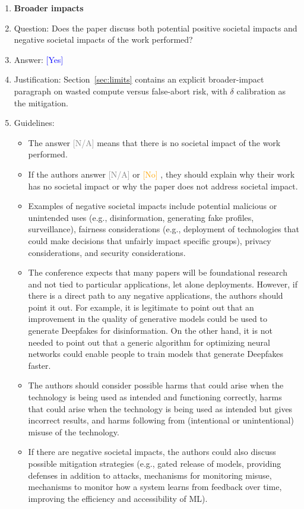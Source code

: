 \documentclass{article}
\providecommand{\answerYes}[1][]{\textcolor{blue}{[Yes] #1}}
\providecommand{\answerNo}[1][]{\textcolor{orange}{[No] #1}}
\providecommand{\answerNA}[1][]{\textcolor{gray}{[N/A] #1}}
\begin{document}
\begin{enumerate}
\item {\bf Broader impacts}
    \item[] Question: Does the paper discuss both potential positive societal impacts and negative societal impacts of the work performed?
    \item[] Answer: \answerYes{}
    \item[] Justification: Section~\ref{sec:limits} contains an explicit broader-impact paragraph on wasted compute versus false-abort risk, with $\delta$ calibration as the mitigation.
    \item[] Guidelines:
    \begin{itemize}
        \item The answer \answerNA{} means that there is no societal impact of the work performed.
        \item If the authors answer \answerNA{} or \answerNo, they should explain why their work has no societal impact or why the paper does not address societal impact.
        \item Examples of negative societal impacts include potential malicious or unintended uses (e.g., disinformation, generating fake profiles, surveillance), fairness considerations (e.g., deployment of technologies that could make decisions that unfairly impact specific groups), privacy considerations, and security considerations.
        \item The conference expects that many papers will be foundational research and not tied to particular applications, let alone deployments. However, if there is a direct path to any negative applications, the authors should point it out. For example, it is legitimate to point out that an improvement in the quality of generative models could be used to generate Deepfakes for disinformation. On the other hand, it is not needed to point out that a generic algorithm for optimizing neural networks could enable people to train models that generate Deepfakes faster.
        \item The authors should consider possible harms that could arise when the technology is being used as intended and functioning correctly, harms that could arise when the technology is being used as intended but gives incorrect results, and harms following from (intentional or unintentional) misuse of the technology.
        \item If there are negative societal impacts, the authors could also discuss possible mitigation strategies (e.g., gated release of models, providing defenses in addition to attacks, mechanisms for monitoring misuse, mechanisms to monitor how a system learns from feedback over time, improving the efficiency and accessibility of ML).
    \end{itemize}


\end{enumerate}
\end{document}
